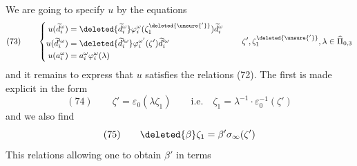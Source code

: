 We are going to specify $u$ by the equations
\[
(73)\qquad\left\{\begin{aligned}
u(\widetilde d_i^\omega)&=\deleted{\widetilde d_i^\omega}\varphi_i^\omega(\zeta_1^{\deleted{\unsure{'}}})\widetilde d_i^\omega\\
u(\widetilde d_i^{\prime\omega})&=\deleted{\widetilde d_i^{\prime\omega}}\varphi_i^{\omega'}(\zeta')\widetilde d_i^{\prime\omega}\\
u(a_i^\omega)&=a_i^\omega\varphi_i^\omega(\lambda)
\end{aligned}\right.\qquad \zeta',\zeta_1^{\deleted{\unsure{'}}},\lambda\in\widehat\Pi_{0,3}
\]
and it remains to express that $u$ satisfies the relations (72). The first is made explicit in the form
\[
(74)\qquad\zeta'=\varepsilon_0(\lambda\zeta_1)\qquad\text{i.e.}\quad\zeta_1=\lambda^{-1}\cdot\varepsilon_0^{-1}(\zeta')
\]
and we also find
\[
(75)\qquad\deleted{\beta}\zeta_1=\beta'\sigma_\infty(\zeta')
\]
This relations allowing one to obtain $\beta'$ in terms
